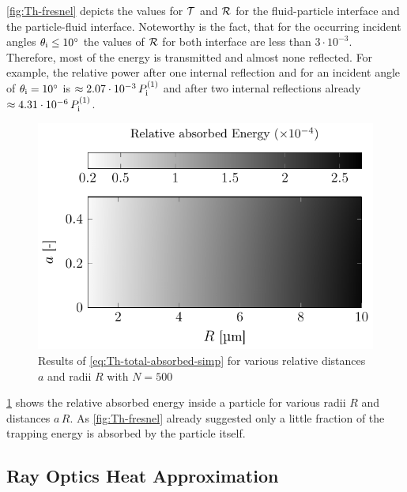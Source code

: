 \cref{fig:Th-fresnel} depicts the values for $\mathcal{T}$ and $\mathcal{R}$ for 
the fluid-particle interface and the particle-fluid interface. Noteworthy is 
the fact, that for the occurring incident angles $\theta_{\mathrm{i}} \leq 
\SI{10}{\degree}$ the values of $\mathcal{R}$ for both interface are less than 
$3\cdot 10^{-3}$. Therefore, most of the energy is transmitted and almost none 
reflected. For example, the relative power after one internal reflection and 
for an incident angle of $\theta_{\mathrm{i}}=\SI{10}{\degree}$ is $\approx 2.07\cdot 
10^{-3}\,P_{\mathrm{i}}^{(1)}$ and after two internal reflections already $\approx 
4.31\cdot 10^{-6}\,P_{\mathrm{i}}^{(1)}$.

\begin{figure}[tbp]
  \centering
  \includegraphics[]{Plots/cache/absorbed_energies.pdf}
  \caption{Results of \cref{eq:Th-total-absorbed-simp} for various relative 
  distances $a$ and radii $R$ with $N=500$ }
  \label{fig:Th-absorbed_energies}
\end{figure}

\cref{fig:Th-absorbed_energies} shows the relative absorbed energy inside a 
particle for various radii $R$ and distances $a\,R$. As \cref{fig:Th-fresnel} 
already suggested only a little fraction of the trapping energy is absorbed by 
the particle itself.

\subsection{Ray Optics Heat Approximation}


